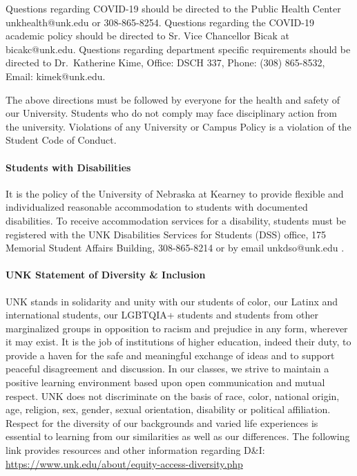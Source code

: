 \documentclass[12pt]{article}
\newcounter{ex}\setcounter{ex}{0}
\begin{document}
Questions regarding COVID-19 should be directed to the Public Health Center unkhealth@unk.edu or 308-865-8254. Questions regarding the COVID-19 academic policy should be directed to Sr. Vice Chancellor Bicak at bicakc@unk.edu. Questions regarding department specific requirements should be directed to Dr.\ Katherine Kime,  Office: DSCH 337, Phone: (308) 865-8532,  Email: kimek@unk.edu.

The above directions must be followed by everyone for the health and safety of our University. Students who do not comply may face disciplinary action from the university. Violations of any University or Campus Policy is a violation of the Student Code of Conduct.




\paragraph{Students with Disabilities} It is the policy of the University of Nebraska at Kearney to provide flexible and individualized reasonable accommodation to students with documented disabilities. To receive accommodation services for a disability, students must be registered with the UNK Disabilities Services for Students (DSS) office, 175 Memorial Student Affairs Building, 308-865-8214 or by email unkdso@unk.edu .



\paragraph{UNK Statement of Diversity \& Inclusion} UNK stands in solidarity and unity with our students of color, our Latinx and international students, our LGBTQIA+ students and students from other marginalized groups in opposition to racism and prejudice in any form, wherever it may exist. It is the job of institutions of higher education, indeed their duty, to provide a haven for the safe and meaningful exchange of ideas and to support peaceful disagreement and discussion. In our classes, we strive to maintain a positive learning environment based upon open communication and mutual respect. UNK does not discriminate on the basis of race, color, national origin, age, religion, sex, gender, sexual orientation, disability or political affiliation. Respect for the diversity of our backgrounds and varied life experiences is essential to learning from our similarities as well as our differences. The following link provides resources and other information regarding D\&I: \url{https://www.unk.edu/about/equity-access-diversity.php}
\end{document}
